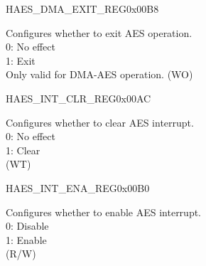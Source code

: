 \begin{register}{H}{AES\_DMA\_EXIT\_REG}{0x00B8}\label{regdesc:AESDMAEXITREG}
%
%
\regnewline%
\begin{regdesc}\begin{reglist}
\item [AES\_DMA\_EXIT] Configures whether to exit AES operation. \\
0: No effect\\
1: Exit\\
Only valid for DMA-AES operation. (WO)
\end{reglist}\end{regdesc}
\end{register}


\begin{register}{H}{AES\_INT\_CLR\_REG}{0x00AC}\label{regdesc:AESINTCLRREG}
%
%
\regnewline%
\begin{regdesc}\begin{reglist}
\item [AES\_INT\_CLR] Configures whether to clear AES interrupt. \\
0: No effect \\
1: Clear \\
(WT)
\end{reglist}\end{regdesc}
\end{register}


\begin{register}{H}{AES\_INT\_ENA\_REG}{0x00B0}\label{regdesc:AESINTENAREG}
%
%
\regnewline%
\begin{regdesc}\begin{reglist}
\item [AES\_INT\_ENA] Configures whether to enable AES interrupt.\\
0: Disable\\
1: Enable \\
(R/W)
\end{reglist}\end{regdesc}
\end{register}

